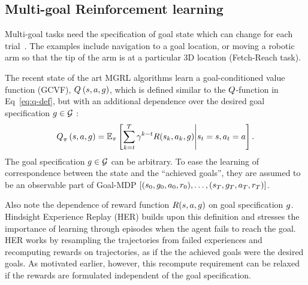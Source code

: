 \subsection{Multi-goal Reinforcement learning}
Multi-goal tasks need the specification of goal state which can change for each
trial~\citep{plappert201802multigoalrl}. The examples include navigation to a
goal location, or moving a robotic arm so that the tip of the arm is at a
particular 3D location (Fetch-Reach task).

The recent state of the art MGRL algorithms learn a goal-conditioned value
function (GCVF), $Q_{}^{}\left({s}, {a}, {g}\right)$, which is defined similar to the
$Q$-function in Eq~\ref{eq:q-def}, but with an additional dependence over the
desired goal specification $g \in \mathcal{G}$ :
%
\begin{align}
Q_{\pi}^{}\left({s}, {a}, {g}\right) = \mathbb{E}_\pi\left[ \sum_{k=t}^T
  \gamma^{k-t} R(s_k, a_k, g)
  \middle| s_t = s, a_t = a \right] .
  \label{eq:q-def}
\end{align}%
%
The goal specification $g \in \mathcal{G}$ can be arbitrary. To ease the learning
of correspondence between the state and the ``achieved goals'', they are assumed
to be an observable part of Goal-MDP $[(s_0, g_0, a_0, r_0), \dots,
(s_T, g_T, a_T, r_T)]$.

Also note the dependence of reward function $R(s, a, g)$ on goal
specification $g$. Hindsight Experience Replay (HER) builds upon this definition
and stresses the importance of learning through episodes when the agent fails to
reach the goal. HER works by resampling the trajectories from failed
experiences and recomputing rewards on trajectories, as if the the achieved
goals were the desired goals. As motivated earlier, however, this recompute
requirement can be relaxed if the rewards are formulated independent of the goal
specification.


